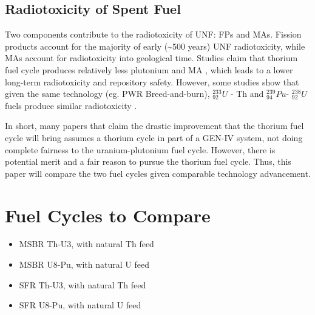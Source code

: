 \documentclass{article}
\newcommand{\uthree}{\xspace $^{233}_{92}U$ \xspace}
\newcommand{\ueight}{\xspace $^{238}_{92}U$\xspace}
\newcommand{\pu}{\xspace$^{239}_{94}Pu$\xspace}
\begin{document}
\subsection{Radiotoxicity of Spent Fuel}
Two components contribute to the radiotoxicity of 
\gls{UNF}: \glspl{FP} and \glspl{MA}.
Fission products account for the majority of early (\textasciitilde 500 years)
\gls{UNF} radiotoxicity, while \glspl{MA} account for 
radiotoxicity into geological time.
Studies claim that thorium fuel cycle produces relatively
less plutonium and \gls{MA} \cite{boczar_thorium_2002} \cite{david_revisiting_2007},
which leads to a lower long-term radiotoxicity and repository safety.
However, some studies show that given the same technology (eg. \gls{PWR} Breed-and-burn),
\uthree - Th and \pu - \ueight fuels produce similar radiotoxicity \cite{croff_comparative_2016}.

In short, many papers that claim the drastic improvement that the thorium
fuel cycle will bring assumes a thorium cycle in part of a GEN-IV system,
not doing complete fairness to the uranium-plutonium fuel cycle. However,
there is potential merit and a fair reason to pursue the thorium fuel cycle.
Thus, this paper will compare the two fuel cycles given comparable technology
advancement. 




%

\section{Fuel Cycles to Compare}
\begin{itemize}
\item MSBR Th-U3, with natural Th feed \cite{robertson_conceptual_1971}
\item MSBR U8-Pu, with natural U feed
\item SFR Th-U3, with natural Th feed
\item SFR U8-Pu, with natural U feed
\end{itemize}



\end{document}
